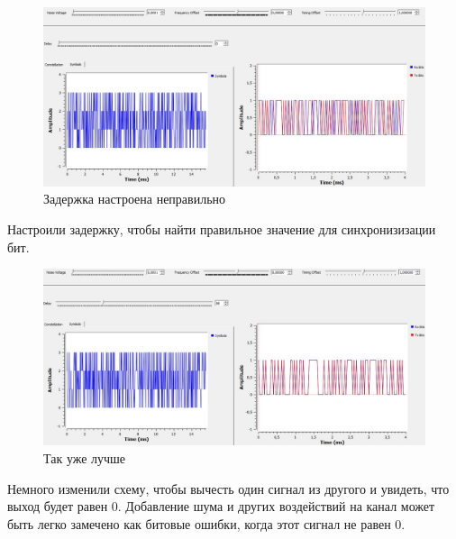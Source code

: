 \documentclass[a4paper, 12pt]{report}
\begin{document}
	\begin{figure}[H]
		\centering
		\includegraphics[width=1.0\textwidth]{40.jpg}
		\caption{Задержка настроена неправильно}
		\label{fig:40}
	\end{figure}
	Настроили задержку, чтобы найти правильное значение для синхронизизации бит.
	\begin{figure}[H]
		\centering
		\includegraphics[width=1.0\textwidth]{41.jpg}
		\caption{Так уже лучше}
		\label{fig:41}
	\end{figure}
	Немного изменили схему, чтобы вычесть один сигнал из другого и увидеть, что выход будет равен 0. Добавление шума и других воздействий на канал может быть легко замечено как битовые ошибки, когда этот сигнал не равен 0.
	
\end{document}
